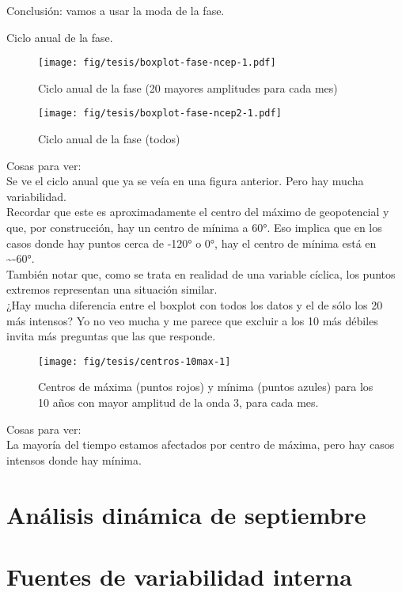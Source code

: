 \documentclass[spanish,a4paper]{book}
\begin{document}
Conclusión: vamos a usar la moda de la fase.

Ciclo anual de la fase.

\begin{figure}
\centering
\texttt{[image: fig/tesis/boxplot-fase-ncep-1.pdf]}
\caption{Ciclo anual de la fase (20 mayores amplitudes para cada mes)}
\end{figure}

\begin{figure}
\centering
\texttt{[image: fig/tesis/boxplot-fase-ncep2-1.pdf]}
\caption{Ciclo anual de la fase (todos)}
\end{figure}

Cosas para ver:\\
Se ve el ciclo anual que ya se veía en una figura anterior. Pero hay
mucha variabilidad.\\
Recordar que este es aproximadamente el centro del máximo de
geopotencial y que, por construcción, hay un centro de mínima a 60°. Eso
implica que en los casos donde hay puntos cerca de -120° o 0°, hay el
centro de mínima está en \textasciitilde{}-60°.\\
También notar que, como se trata en realidad de una variable cíclica,
los puntos extremos representan una situación similar.\\
¿Hay mucha diferencia entre el boxplot con todos los datos y el de sólo
los 20 más intensos? Yo no veo mucha y me parece que excluir a los 10
más débiles invita más preguntas que las que responde.

\begin{figure}

{\centering \texttt{[image: fig/tesis/centros-10max-1]} 

}

\caption{Centros de máxima (puntos rojos) y mínima (puntos azules) para los 10 años con mayor amplitud de la onda 3, para cada mes.}\label{fig:centros-10max}
\end{figure}

Cosas para ver:\\
La mayoría del tiempo estamos afectados por centro de máxima, pero hay
casos intensos donde hay mínima.

\section{Análisis dinámica de
septiembre}\label{analisis-dinamica-de-septiembre}

\section{Fuentes de variabilidad
interna}\label{fuentes-de-variabilidad-interna}
\end{document}
